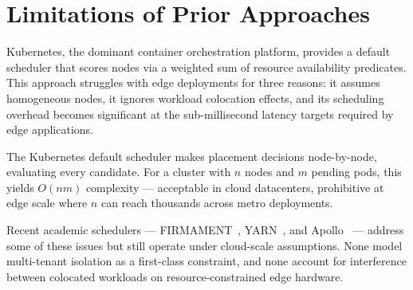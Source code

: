 \section{Limitations of Prior Approaches}

Kubernetes, the dominant container orchestration platform, provides a default scheduler that scores nodes via a weighted sum of resource availability predicates. This approach struggles with edge deployments for three reasons: it assumes homogeneous nodes, it ignores workload colocation effects, and its scheduling overhead becomes significant at the sub-millisecond latency targets required by edge applications.

\begin{tcolorbox}[colback=accentBurgundy!5,colframe=accentBurgundy!50,title=\textbf{Limitation}]
The Kubernetes default scheduler makes placement decisions node-by-node, evaluating every candidate. For a cluster with \(n\) nodes and \(m\) pending pods, this yields \(O(n m)\) complexity --- acceptable in cloud datacenters, prohibitive at edge scale where \(n\) can reach thousands across metro deployments.
\end{tcolorbox}

Recent academic schedulers --- FIRMAMENT~\cite{gog2016}, YARN~\cite{vavilapalli2013}, and Apollo~\cite{boutin2014} --- address some of these issues but still operate under cloud-scale assumptions. None model multi-tenant isolation as a first-class constraint, and none account for interference between colocated workloads on resource-constrained edge hardware.
